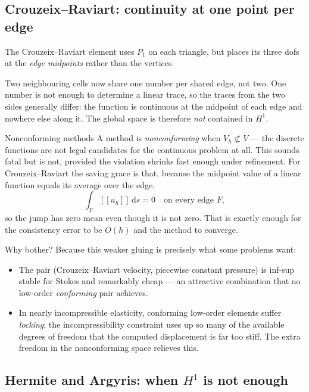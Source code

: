 \documentclass[11pt,a4paper]{article}
\newcommand{\jump}[1]{[\![#1]\!]}
\newcommand{\ds}{\,\mathrm{d}s}
\begin{document}
\subsection{Crouzeix--Raviart: continuity at one point per edge}

The Crouzeix--Raviart element uses $P_1$ on each triangle, but places its three
dofs at the \emph{edge midpoints} rather than the vertices.

Two neighbouring cells now share one number per shared edge, not two. One number
is not enough to determine a linear trace, so the traces from the two sides
generally differ: the function is continuous at the midpoint of each edge and
nowhere else along it. The global space is therefore \emph{not} contained in
$H^1$.

\begin{jargon}{Nonconforming methods}
A method is \emph{nonconforming} when $V_h \not\subset V$ --- the discrete
functions are not legal candidates for the continuous problem at all. This
sounds fatal but is not, provided the violation shrinks fast enough under
refinement. For Crouzeix--Raviart the saving grace is that, because the midpoint
value of a linear function equals its average over the edge,
\[
  \int_F \jump{u_h} \ds = 0 \quad\text{on every edge } F,
\]
so the jump has zero mean even though it is not zero. That is exactly enough for
the consistency error to be $O(h)$ and the method to converge.
\end{jargon}

Why bother? Because this weaker gluing is precisely what some problems want:

\begin{itemize}
\item The pair (Crouzeix--Raviart velocity, piecewise constant pressure) is
  inf-sup stable for Stokes and remarkably cheap --- an attractive combination
  that no low-order \emph{conforming} pair achieves.
\item In nearly incompressible elasticity, conforming low-order elements suffer
  \emph{locking}: the incompressibility constraint uses up so many of the
  available degrees of freedom that the computed displacement is far too stiff.
  The extra freedom in the nonconforming space relieves this.
\end{itemize}

\subsection{Hermite and Argyris: when $H^1$ is not enough}
\end{document}
